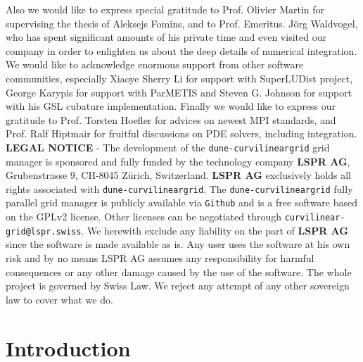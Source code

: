 \documentclass[a4paper,11pt]{article}
\newcommand{\curvgrid}{\setlength\emergencystretch{3cm}\texttt{dune-curvilineargrid}}
\begin{document}
\noindent
Also we would like to express special gratitude to Prof. Olivier Martin for supervising the thesis of Aleksejs Fomins, and to Prof. Emeritus. J\"org Waldvogel, who has spent significant amounts of his private time and even visited our company in order to enlighten us about the deep details of numerical integration. We would like to acknowledge enormous support from other software communities, especially Xiaoye Sherry Li for support with SuperLUDist project, George Karypis for support with ParMETIS and Steven G. Johnson for support with his GSL cubature implementation. Finally we would like to express our gratitude to Prof. Torsten Hoefler for advices on newest MPI standards, and Prof. Ralf Hiptmair for fruitful discussions on PDE solvers, including integration. \\





\vspace{5mm}
{\small
\noindent \textbf{LEGAL NOTICE} - The development of the \curvgrid{} grid manager is sponsored and fully funded by the technology company \textbf{LSPR AG}, Grubenstrasse 9, CH-8045 Z\"urich, Switzerland. \textbf{LSPR AG} exclusively holds all rights associated with \curvgrid{}.
The \curvgrid{} fully parallel grid manager is publicly available via \texttt{Github} and is a free software based on the GPLv2 license. Other licenses can be negotiated through \texttt{curvilinear-grid@lspr.swiss}.
We herewith exclude any liability on the part of \textbf{LSPR AG} since the software is made available as is. Any user uses the software at his own risk and by no means LSPR AG assumes any responsibility for harmful consequences or any other damage caused by the use of the software. The whole project is governed by Swiss Law. We reject any attempt of any other sovereign law to cover what we do.
}


\tableofcontents


\newpage
\section{Introduction}
\end{document}
